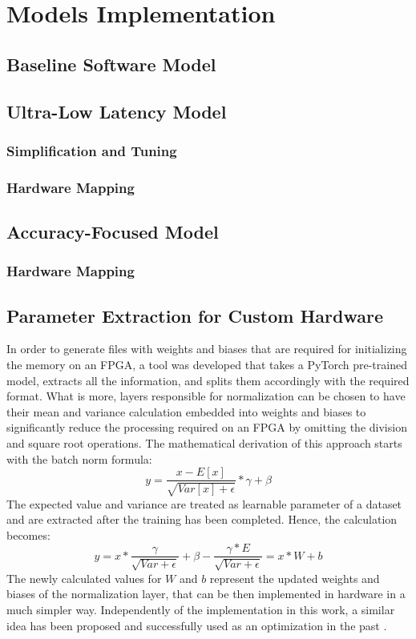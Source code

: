 \chapter{Models Implementation}\label{models}


\section{Baseline Software Model}


\section{Ultra-Low Latency Model}

\subsection{Simplification and Tuning}

\subsection{Hardware Mapping}


\section{Accuracy-Focused Model}

\subsection{Hardware Mapping}


\section{Parameter Extraction for Custom Hardware}

In order to generate files with weights and biases that are required for initializing the memory on an FPGA, a tool was developed that takes a PyTorch pre-trained model, extracts all the information, and splits them accordingly with the required format. What is more, layers responsible for normalization can be chosen to have their mean and variance calculation embedded into weights and biases to significantly reduce the processing required on an FPGA by omitting the division and square root operations. The mathematical derivation of this approach starts with the batch norm formula:
\[ y = \frac{x - E[x]}{\sqrt{Var[x] + \epsilon}} * \gamma + \beta \]
The expected value and variance are treated as learnable parameter of a dataset and are extracted after the training has been completed. Hence, the calculation becomes:
\[ y = x * \frac{\gamma}{\sqrt{Var + \epsilon}} + \beta - \frac{\gamma * E}{\sqrt{Var + \epsilon}} = x * W + b\]
The newly calculated values for \(W\) and \(b\) represent the updated weights and biases of the normalization layer, that can be then implemented in hardware in a much simpler way. Independently of the implementation in this work, a similar idea has been proposed and successfully used as an optimization in the past \cite{46-fan2018real-time}.


